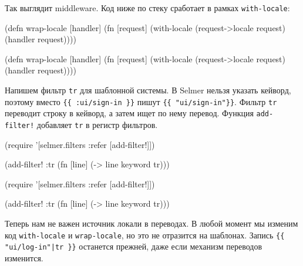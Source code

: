 \fi

Так выглядит middleware. Код ниже по стеку сработает в рамках
\verb|with-locale|:

\ifnarrow

\begin{english}
  \begin{clojure}
(defn wrap-locale [handler]
  (fn [request]
    (with-locale
      (request->locale request)
      (handler request))))
  \end{clojure}
\end{english}

\else

\begin{english}
  \begin{clojure}
(defn wrap-locale [handler]
  (fn [request]
    (with-locale (request->locale request)
      (handler request))))
  \end{clojure}
\end{english}

\fi

Напишем фильтр \verb|tr| для шаблонной системы. В Selmer нельзя указать кейворд,
поэтому вместо \verb|{{ :ui/sign-in }}| пишут \verb|{{ "ui/sign-in"}}|.  Фильтр
\verb|tr| переводит строку в кейворд, а затем ищет по нему перевод. Функция
\verb|add-filter!| добавляет \verb|tr| в регистр фильтров.

\ifnarrow

\begin{english}
  \begin{clojure}
(require
 '[selmer.filters :refer [add-filter!]])

(add-filter! :tr
 (fn [line]
   (-> line keyword tr)))
  \end{clojure}
\end{english}

\else

\begin{english}
  \begin{clojure}
(require '[selmer.filters :refer [add-filter!]])

(add-filter! :tr
 (fn [line]
   (-> line keyword tr)))
  \end{clojure}
\end{english}

\fi

Теперь нам не важен источник локали в переводах. В любой момент мы изменим код
\verb|with-locale| и \verb|wrap-locale|, но это не отразится на
шаблонах. Запись \verb={{ "ui/log-in"|tr }}= останется прежней, даже если
механизм переводов изменится.

